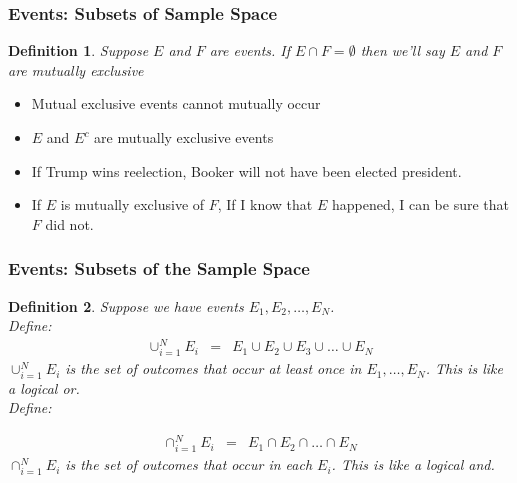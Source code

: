 \documentclass[handout]{beamer}
\newtheorem{defn}{Definition}
\numberwithin{equation}{section}
\begin{document}
\begin{frame}
\frametitle{Events: Subsets of Sample Space}

\begin{defn}
Suppose $E$ and $F$ are events.  If $E \cap F = \emptyset$ then we'll say $E$ and $F$ are \alert{mutually exclusive}
\end{defn}

\pause 

\begin{itemize}
\item[-] Mutual exclusive events cannot mutually occur \pause 
\item[-] $E$ and $E^{c}$ are mutually exclusive events \pause 
\end{itemize}

\begin{itemize}
\item[-] If Trump wins reelection, Booker will not have been elected president. \pause 
\item[-] If $E$ is mutually exclusive of $F$, If I know that $E$ happened, I can be sure that $F$ did not.
\end{itemize}


\end{frame}



\begin{frame}
\frametitle{Events: Subsets of the Sample Space}

\begin{defn}
Suppose we have events $E_{1}, E_{2}, \hdots, E_{N}$.  \\
Define: 
\begin{eqnarray}
\cup_{i=1}^{N} E_{i} & = & E_{1} \cup E_{2} \cup E_{3} \cup \hdots \cup E_{N} \nonumber
\end{eqnarray}
 $\cup_{i=1}^{N} E_{i} $ is the set of outcomes that occur at least once in $E_{1} , \hdots, E_{N}$.  This is like a logical or. \pause \\


Define: 


\begin{eqnarray}
\cap_{i=1}^{N} E_{i} & = & E_{1} \cap E_{2} \cap \hdots \cap E_{N} \nonumber 
\end{eqnarray}
$\cap_{i=1}^{N} E_{i} $ is the set of outcomes that occur in each $E_{i}$.  This is like a logical and.


\end{defn}


\end{frame}
\end{document}
